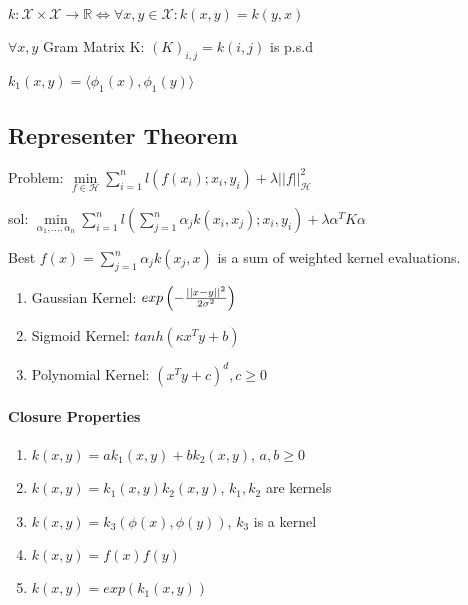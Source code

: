 \documentclass[11pt,twocolumn]{article}
\begin{document}
$k: \mathcal{X} \times \mathcal{X} \rightarrow \mathbb{R}  \Leftrightarrow \forall x,y \in \mathcal{X} : k\left( x , y \right) = k \left(y,x\right)$

$\forall x, y$
Gram Matrix K: $(K)_{i,j} = k(i,j)$ is p.s.d

$k_1(x,y) = \langle \phi_1(x), \phi_1(y) \rangle $

\subsection{Representer Theorem}

Problem: $\min \limits_{f \in \mathcal{H}} \sum \limits_{i=1}^n l(f(x_i);x_i, y_i) + \lambda || f||_{\mathcal{H}}^2$

sol: $\min \limits_{\alpha_1,...,\alpha_n} \sum \limits_{i=1}^n l \left( \sum \limits_{j=1}^n \alpha_j k(x_i, x_j);x_i,y_i  \right) + \lambda \alpha^T K \alpha$

Best $f(x) = \sum \limits_{j=1}^n \alpha_j k(x_j, x)$ is a sum of weighted kernel evaluations.


\begin{enumerate}[noitemsep]

\item Gaussian Kernel: $exp\left( - {{||x-y||^2}\over{2 \sigma^2}} \right)$ 

\item Sigmoid Kernel: $tanh(\kappa x^T y + b)$

\item Polynomial Kernel: $\left( x^Ty + c \right)^d, c \geq 0$

\end{enumerate}

\paragraph{Closure Properties}

\begin{enumerate}
\item $k(x,y) = a k_1(x,y) + b k_2(x,y)$, $a,b \geq 0$
\item $k(x,y) =  k_1(x,y)  k_2(x,y)$, $k_1, k_2$ are kernels
\item $k(x,y) =  k_3(\phi(x),  \phi(y))$, $k_3$ is a kernel
\item $k(x,y) =  f(x) f(y)$
\item $k(x,y) =  exp(k_1(x,y))$
\end{enumerate}

\end{document}

